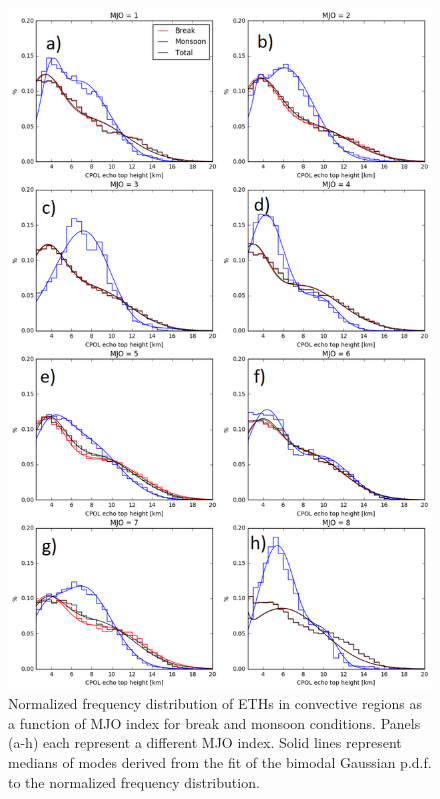 \documentclass[journal abbreviation, manuscript]{copernicus}
\begin{document}
\begin{figure}[t]
\includegraphics[width=12cm]{bimodal_fits_convective.png}
\caption{Normalized frequency distribution of ETHs in convective regions as a function of MJO index for break and monsoon conditions. Panels (a-h) each represent a different MJO index. Solid lines represent medians of modes derived from the fit of the bimodal Gaussian p.d.f. to the normalized frequency distribution.}
\label{fig:bimodal_fits}
\end{figure}
\clearpage
\end{document}

